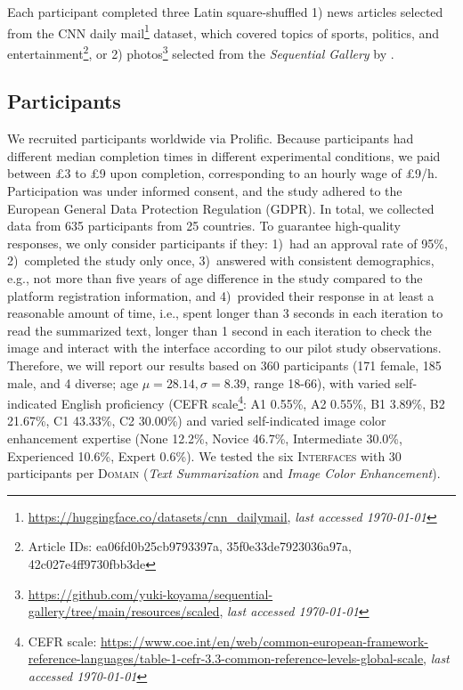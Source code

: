 \documentclass[acmsmall,screen,nonacm]{acmart}
\begin{document}
Each participant completed three Latin square-shuffled 1) news articles selected from the CNN daily mail\footnote{\url{https://huggingface.co/datasets/cnn_dailymail}, \emph{last accessed \today}} dataset, which covered topics of sports, politics, and entertainment\footnote{Article IDs: ea06fd0b25cb9793397a, 35f0e33de7923036a97a, 42c027e4ff9730fbb3de}, or 2) photos\footnote{\url{https://github.com/yuki-koyama/sequential-gallery/tree/main/resources/scaled}, \emph{last accessed \today}} selected from the \emph{Sequential Gallery} by \citet{koyama2020sequential}.

\subsection{Participants}
We recruited participants worldwide via Prolific. %
Because participants had different median completion times in different experimental conditions, we paid between £3 to £9 upon completion, corresponding to an hourly wage of £9/h. Participation was under informed consent, and the study adhered to the European General Data Protection Regulation (GDPR). In total, we collected data from 635 participants from 25 countries.
To guarantee high-quality responses, we only consider participants if they: 1)~had an approval rate of 95\%, 2)~completed the study only once, 3)~answered with consistent demographics, e.g., not more than five years of age difference in the study compared to the platform registration information, and 4)~provided their response in at least a reasonable amount of time, i.e., spent longer than 3 seconds in each iteration to read the summarized text, longer than 1 second in each iteration to check the image and interact with the interface according to our pilot study observations.
Therefore, we will report our results based on 360 participants (171 female, 185 male, and 4 diverse; age $\mu=28.14, \sigma=8.39$, range 18-66), with varied self-indicated English proficiency (CEFR scale\footnote{CEFR scale: \url{https://www.coe.int/en/web/common-european-framework-reference-languages/table-1-cefr-3.3-common-reference-levels-global-scale}, \emph{last accessed \today}}: A1 0.55\%, A2 0.55\%, B1 3.89\%, B2 21.67\%, C1 43.33\%, C2 30.00\%) and varied self-indicated image color enhancement expertise (None 12.2\%, Novice 46.7\%, Intermediate 30.0\%, Experienced 10.6\%, Expert 0.6\%). We tested the six \textsc{Interfaces} with 30 participants per \textsc{Domain} (\textit{Text Summarization} and \textit{Image Color Enhancement}).
\end{document}
